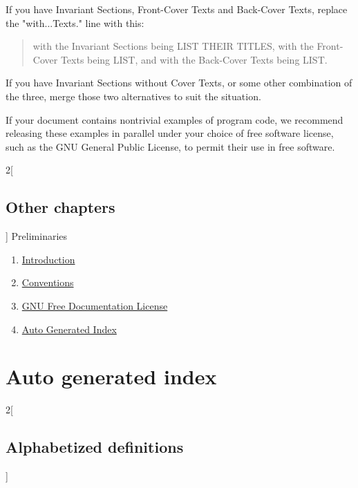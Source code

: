 \documentclass{stacks-project-book}
\theoremstyle{plain}
\theoremstyle{definition}
\theoremstyle{remark}
\numberwithin{equation}{subsection}
\begin{document}
If you have Invariant Sections, Front-Cover Texts and Back-Cover Texts,
replace the "with...Texts." line with this:

\bigskip
\begin{quote}
    with the Invariant Sections being LIST THEIR TITLES, with the
    Front-Cover Texts being LIST, and with the Back-Cover Texts being LIST.
\end{quote}
\bigskip

If you have Invariant Sections without Cover Texts, or some other
combination of the three, merge those two alternatives to suit the
situation.

If your document contains nontrivial examples of program code, we
recommend releasing these examples in parallel under your choice of
free software license, such as the GNU General Public License,
to permit their use in free software.

\begin{multicols}{2}[\section{Other chapters}]
\noindent
Preliminaries
\begin{enumerate}
\item \hyperref[introduction-section-phantom]{Introduction}
\item \hyperref[conventions-section-phantom]{Conventions}
\item \hyperref[fdl-section-phantom]{GNU Free Documentation License}
\item \hyperref[index-section-phantom]{Auto Generated Index}
\end{enumerate}
\end{multicols}
\chapter{Auto generated index}

\label{index-section-phantom}


\frenchspacing


\begin{multicols}{2}[\section{Alphabetized definitions}\label{index-section-alphabetized}]
\end{multicols}
\end{document}
